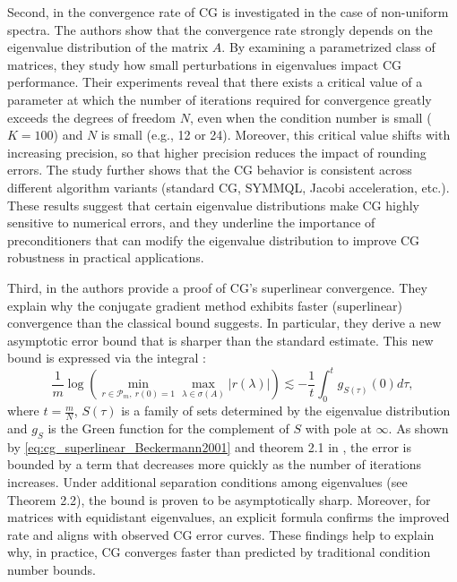 Second, in \cite{cg_convrate_Strakos1991} the convergence rate of CG is investigated in the case of non-uniform spectra. The authors show that the convergence rate strongly depends on the eigenvalue distribution of the matrix \(A\). By examining a parametrized class of matrices, they study how small perturbations in eigenvalues impact CG performance. Their experiments reveal that there exists a critical value of a parameter at which the number of iterations required for convergence greatly exceeds the degrees of freedom \(N\), even when the condition number is small (\(K=100\)) and \(N\) is small (e.g., 12 or 24). Moreover, this critical value shifts with increasing precision, so that higher precision reduces the impact of rounding errors. The study further shows that the CG behavior is consistent across different algorithm variants (standard CG, SYMMQL, Jacobi acceleration, etc.). These results suggest that certain eigenvalue distributions make CG highly sensitive to numerical errors, and they underline the importance of preconditioners that can modify the eigenvalue distribution to improve CG robustness in practical applications.

Third, in \cite{cg_superlinear_Beckermann2001} the authors provide a proof of CG's superlinear convergence. They explain why the conjugate gradient method exhibits faster (superlinear) convergence than the classical bound suggests. In particular, they derive a new asymptotic error bound that is sharper than the standard estimate. This new bound is expressed via the integral \cite[Equation 1.8]{cg_superlinear_Beckermann2001}:
\begin{equation}
    \frac{1}{m} \log \left(\min_{r\in\mathcal{P}_m, \ r(0)=1}\max_{\lambda \in \sigma(A)}|r(\lambda)|\right) \lesssim-\frac{1}{t} \int_0^t g_{S(\tau)}(0) d \tau,
    \label{eq:cg_superlinear_Beckermann2001}
\end{equation}
where $t = \frac{m}{N}$, $S(\tau)$ is a family of sets determined by the eigenvalue distribution and $g_S$ is the Green function for the complement of $S$ with pole at $\infty$. As shown by \cref{eq:cg_superlinear_Beckermann2001} and theorem 2.1 in \cite{cg_sharp_bound_Beckermann2001}, the error is bounded by a term that decreases more quickly as the number of iterations increases. Under additional separation conditions among eigenvalues (see Theorem 2.2), the bound is proven to be asymptotically sharp. Moreover, for matrices with equidistant eigenvalues, an explicit formula \cite[Corollary 3.2 and Equation 3.11]{cg_superlinear_Beckermann2001} confirms the improved rate and aligns with observed CG error curves. These findings help to explain why, in practice, CG converges faster than predicted by traditional condition number bounds.

